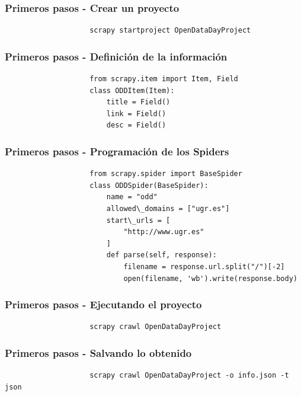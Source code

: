 \documentclass{beamer}
\begin{document}
		\begin{frame}[fragile]
			\frametitle{Primeros pasos - Crear un proyecto}
				\begin{semiverbatim}
					\begin{lstlisting}
					scrapy startproject OpenDataDayProject
					\end{lstlisting}
				\end{semiverbatim}
		\end{frame}
		\begin{frame}[fragile]
			\frametitle{Primeros pasos - Definición de la información}
				\begin{semiverbatim}
					\begin{lstlisting}
					from scrapy.item import Item, Field
					class ODDItem(Item):
					    title = Field()
					    link = Field()
					    desc = Field()
					\end{lstlisting}
				\end{semiverbatim}
		\end{frame}
		\begin{frame}[fragile]
			\frametitle{Primeros pasos - Programación de los Spiders}
				\begin{semiverbatim}
					\begin{lstlisting}
					from scrapy.spider import BaseSpider
					class ODDSpider(BaseSpider):
					    name = "odd"
					    allowed\_domains = ["ugr.es"]
					    start\_urls = [
					        "http://www.ugr.es"
					    ]
					    def parse(self, response):
					        filename = response.url.split("/")[-2]
					        open(filename, 'wb').write(response.body)
					\end{lstlisting}
				\end{semiverbatim}
		\end{frame}
		\begin{frame}[fragile]
			\frametitle{Primeros pasos - Ejecutando el proyecto}
				\begin{semiverbatim}
					\begin{lstlisting}
					scrapy crawl OpenDataDayProject
					\end{lstlisting}
				\end{semiverbatim}
		\end{frame}
		\begin{frame}[fragile]
			\frametitle{Primeros pasos - Salvando lo obtenido}
				\begin{semiverbatim}
					\begin{lstlisting}
					scrapy crawl OpenDataDayProject -o info.json -t json
					\end{lstlisting}
				\end{semiverbatim}
		\end{frame}
\end{document}
